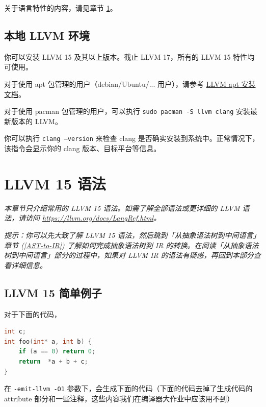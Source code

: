 关于语言特性的内容，请见章节 \ref{LLVM-semantic}。

\subsection{本地 LLVM 环境}

你可以安装 LLVM 15 及其以上版本。截止 LLVM 17，所有的 LLVM 15 特性均可使用。

对于使用 apt 包管理的用户（debian/Ubuntu/... 用户），请参考 \href{https://apt.llvm.org/}{LLVM apt 安装文档}。

对于使用 pacman 包管理的用户，可以执行 \texttt{sudo pacman -S llvm clang} 安装最新版本的 LLVM。

你可以执行 \texttt{clang --version} 来检查 clang 是否确实安装到系统中。正常情况下，该指令会显示你的
clang 版本、目标平台等信息。

\section{LLVM 15 语法}\label{LLVM-semantic}

\textit{本章节只介绍常用的 LLVM 15 语法。如需了解全部语法或更详细的 LLVM 语法，请访问
\url{https://llvm.org/docs/LangRef.html}。}

\textit{提示：你可以先大致了解 LLVM 15 语法，然后跳到「从抽象语法树到中间语言」章节
(\ref{AST-to-IR}) 了解如何完成抽象语法树到 IR
的转换。在阅读「从抽象语法树到中间语言」部分的过程中，如果对 LLVM IR
的语法有疑惑，再回到本部分查看详细信息。}

\subsection{LLVM 15 简单例子}

对于下面的代码，

\begin{lstlisting}[language=C]
int c;
int foo(int* a, int b) {
    if (a == 0) return 0;
    return  *a + b + c;
}
\end{lstlisting}

在 \texttt{-emit-llvm -O1} 参数下，会生成下面的代码（下面的代码去掉了生成代码的
attribute 部分和一些注释，这些内容我们在编译器大作业中应该用不到）

